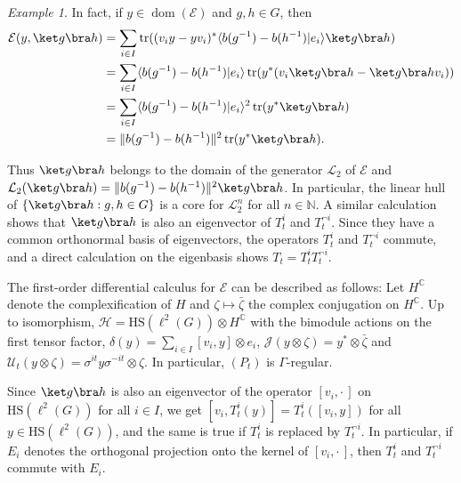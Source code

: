 \documentclass[12pt,a4paper]{amsart}
\newcommand{\1}{\mathds{1}}
\newcommand{\tr}{\operatorname{tr}}
\newcommand{\E}{\mathcal E}
\renewcommand{\H}{\mathcal H}
\newcommand{\J}{\mathcal J}
\renewcommand{\L}{\mathcal L}
\newcommand{\U}{\mathcal U}
\newcommand{\IC}{\mathbb C}
\newcommand{\IN}{\mathbb N}
\newcommand{\dom}{\operatorname{dom}}
\newcommand{\norm}[1]{\lVert#1\rVert}
\theoremstyle{plain}
\theoremstyle{definition}
\theoremstyle{remark}
\newtheorem{example}[proposition]{Example}
\begin{document}
\begin{example}
    In fact, if $y\in \dom(\E)$ and $g,h\in G$, then
    \begin{align*}
        \E(y,\ket g\bra h)&=\sum_{i\in I}\tr((v_i y-yv_i)^\ast\langle b(g^{-1})-b(h^{-1})|e_i\rangle\ket g\bra h)\\
        &=\sum_{i\in I}\langle b(g^{-1})-b(h^{-1})|e_i\rangle\tr(y^\ast(v_i\ket g\bra h-\ket g\bra h v_i))\\
        &=\sum_{i\in I}\langle b(g^{-1})-b(h^{-1})|e_i\rangle^2\tr(y^\ast \ket g\bra h)\\
        &=\norm{b(g^{-1})-b(h^{-1})}^2\tr(y^\ast \ket g\bra h).
    \end{align*}

    Thus $\ket g\bra h$ belongs to the domain of the generator $\L_2$ of $\E$ and $\L_2(\ket g\bra h)=\norm{b(g^{-1})-b(h^{-1})}^2\ket g\bra h$. In particular, the linear hull of $\{\ket g\bra h : g,h\in G\}$ is a core for $\L_2^n$ for all $n\in\IN$. A similar calculation shows that $\ket g\bra h$ is also an eigenvector of $T_t^i$ and $T_t^{\neg i}$. Since they have a common orthonormal basis of eigenvectors, the operators $T_t^i$ and $T_t^{\neg i}$ commute, and a direct calculation on the eigenbasis shows $T_t=T_t^i T_t^{\neg i}$.

    The first-order differential calculus for $\E$ can be described as follows: Let $H^\IC$ denote the complexification of $H$ and $\zeta\mapsto\bar\zeta$ the complex conjugation on $H^\IC$. Up to isomorphism, $\H=\mathrm{HS}(\ell^2(G))\otimes H^{\mathbb C}$ with the bimodule actions on the first tensor factor, $\delta(y)=\sum_{i\in I}[v_i,y]\otimes e_i$, $\J(y\otimes \zeta)=y^\ast\otimes\bar\zeta$ and $\U_t(y\otimes\zeta)=\sigma^{it}y\sigma^{-it}\otimes\zeta$. In particular, $(P_t)$ is $\Gamma$-regular.

    Since $\ket g\bra h$ is also an eigenvector of the operator $[v_i,\cdot\,]$ on $\mathrm{HS}(\ell^2(G))$ for all $i\in I$, we get $[v_i,T_t^i(y)]=T_t^i([v_i,y])$ for all $y\in \mathrm{HS}(\ell^2(G))$, and the same is true if $T_t^i$ is replaced by $T_t^{\neg i}$. In particular, if $E_i$ denotes the orthogonal projection onto the kernel of $[v_i,\cdot\,]$, then $T_t^i$ and $T_t^{\neg i}$ commute with $E_i$.


\end{example}
\end{document}

